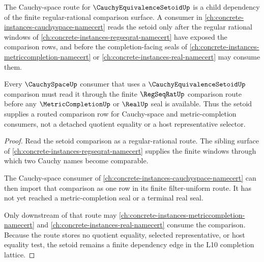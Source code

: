 The Cauchy-space route for $\CauchyEquivalenceSetoidUp$ is a child dependency of the finite regular-rational comparison surface. A consumer in \autoref{ch:concrete-instances-cauchyspace-namecert} reads the setoid only after the regular rational windows of \autoref{ch:concrete-instances-regseqrat-namecert} have exposed the comparison rows, and before the completion-facing seals of \autoref{ch:concrete-instances-metriccompletion-namecert} or \autoref{ch:concrete-instances-real-namecert} may consume them.

\begin{theorem}
\label{thm:cauchy-space-cauchy-equivalence-setoid-route}
Every $\CauchySpaceUp$ consumer that uses a $\CauchyEquivalenceSetoidUp$ comparison must read it through the finite $\RegSeqRatUp$ comparison route before any $\MetricCompletionUp$ or $\RealUp$ seal is available. Thus the setoid supplies a routed comparison row for Cauchy-space and metric-completion consumers, not a detached quotient equality or a host representative selector.
\end{theorem}
\begin{proof}
Read the setoid comparison as a regular-rational route. The sibling surface of \autoref{ch:concrete-instances-regseqrat-namecert} supplies the finite windows through which two Cauchy names become comparable.

The Cauchy-space consumer of \autoref{ch:concrete-instances-cauchyspace-namecert} can then import that comparison as one row in its finite filter-uniform route. It has not yet reached a metric-completion seal or a terminal real seal.

Only downstream of that route may \autoref{ch:concrete-instances-metriccompletion-namecert} and \autoref{ch:concrete-instances-real-namecert} consume the comparison. Because the route stores no quotient equality, selected representative, or host equality test, the setoid remains a finite dependency edge in the L10 completion lattice.
\end{proof}
